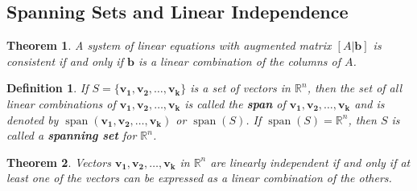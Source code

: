\documentclass{article}
\newtheorem*{theorem*}{Theorem}
\newtheorem*{definition*}{Definition}
\begin{document}
\subsection{Spanning Sets and Linear Independence}
\begin{theorem*}
  A system of linear equations with augmented matrix $[A|\mathbf{b}]$ is consistent if and only if
  $\mathbf{b}$ is a linear combination of the columns of $A$.
\end{theorem*}
\begin{definition*}
  If $S=\{\mathbf{v_1}, \mathbf{v_2}, \ldots, \mathbf{v_k}\}$ is a set of vectors in $\mathbb{R}^n$,
  then the set of all linear combinations of $\mathbf{v_1}, \mathbf{v_2}, \ldots, \mathbf{v_k}$ is
  called the \textbf{span} of $\mathbf{v_1}, \mathbf{v_2}, \ldots, \mathbf{v_k}$ and is denoted by
  $\operatorname{span}(\mathbf{v_1}, \mathbf{v_2}, \ldots, \mathbf{v_k})$ or
  $\operatorname{span}(S)$. If $\operatorname{span}(S)=\mathbb{R}^n$, then $S$ is called a
  \textbf{spanning set} for $\mathbb{R}^n$.
\end{definition*}
\begin{theorem*}
  Vectors $\mathbf{v_1}, \mathbf{v_2}, \ldots, \mathbf{v_k}$ in $\mathbb{R}^n$ are linearly
  independent if and only if at least one of the vectors can be expressed as a linear combination of
  the others.
\end{theorem*}
\end{document}
